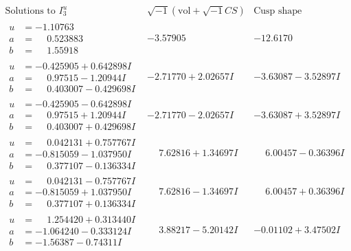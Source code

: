 \documentclass[1p]{elsarticle_modified}
\theoremstyle{definition}
\newcommand{\I}{\sqrt{-1}}
\begin{document}
$$\begin{array}{c|c|c}  
\text{Solutions to }I^u_{3}& \I (\text{vol} + \sqrt{-1}CS) & \text{Cusp shape}\\
 \hline 
\begin{aligned}
u &= -1.10763\phantom{ +0.000000I} \\
a &= \phantom{-}0.523883\phantom{ +0.000000I} \\
b &= \phantom{-}1.55918\phantom{ +0.000000I}\end{aligned}
 & -3.57905\phantom{ +0.000000I} & -12.6170\phantom{ +0.000000I} \\ \hline\begin{aligned}
u &= -0.425905 + 0.642898 I \\
a &= \phantom{-}0.97515 - 1.20944 I \\
b &= \phantom{-}0.403007 - 0.429698 I\end{aligned}
 & -2.71770 + 2.02657 I & -3.63087 - 3.52897 I \\ \hline\begin{aligned}
u &= -0.425905 - 0.642898 I \\
a &= \phantom{-}0.97515 + 1.20944 I \\
b &= \phantom{-}0.403007 + 0.429698 I\end{aligned}
 & -2.71770 - 2.02657 I & -3.63087 + 3.52897 I \\ \hline\begin{aligned}
u &= \phantom{-}0.042131 + 0.757767 I \\
a &= -0.815059 - 1.037950 I \\
b &= \phantom{-}0.377107 - 0.136334 I\end{aligned}
 & \phantom{-}7.62816 + 1.34697 I & \phantom{-}6.00457 - 0.36396 I \\ \hline\begin{aligned}
u &= \phantom{-}0.042131 - 0.757767 I \\
a &= -0.815059 + 1.037950 I \\
b &= \phantom{-}0.377107 + 0.136334 I\end{aligned}
 & \phantom{-}7.62816 - 1.34697 I & \phantom{-}6.00457 + 0.36396 I \\ \hline\begin{aligned}
u &= \phantom{-}1.254420 + 0.313440 I \\
a &= -1.064240 - 0.333124 I \\
b &= -1.56387 - 0.74311 I\end{aligned}
 & \phantom{-}3.88217 - 5.20142 I & -0.01102 + 3.47502 I \\ \hline\begin{aligned}

\end{aligned}
\end{array}$$
\end{document}
